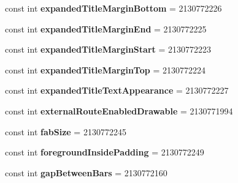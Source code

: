 \begin{DoxyCompactItemize}
const int {\bfseries expanded\+Title\+Margin\+Bottom} = 2130772226
\item 
\mbox{\label{class_pinned_app_1_1_droid_1_1_resource_1_1_attribute_a1eaa227489b33d853421362cdaa9c456}} 
const int {\bfseries expanded\+Title\+Margin\+End} = 2130772225
\item 
\mbox{\label{class_pinned_app_1_1_droid_1_1_resource_1_1_attribute_a56f2017d06f2047e019e582e5f820205}} 
const int {\bfseries expanded\+Title\+Margin\+Start} = 2130772223
\item 
\mbox{\label{class_pinned_app_1_1_droid_1_1_resource_1_1_attribute_aab2fb18567590b37b1f568d2fc99a039}} 
const int {\bfseries expanded\+Title\+Margin\+Top} = 2130772224
\item 
\mbox{\label{class_pinned_app_1_1_droid_1_1_resource_1_1_attribute_ae05054956b217031566367be0abed923}} 
const int {\bfseries expanded\+Title\+Text\+Appearance} = 2130772227
\item 
\mbox{\label{class_pinned_app_1_1_droid_1_1_resource_1_1_attribute_a90b6e17c852676ddb29de6bc76f2a2c1}} 
const int {\bfseries external\+Route\+Enabled\+Drawable} = 2130771994
\item 
\mbox{\label{class_pinned_app_1_1_droid_1_1_resource_1_1_attribute_ab590cb3d177383e8e0141f3ba41ee7d2}} 
const int {\bfseries fab\+Size} = 2130772245
\item 
\mbox{\label{class_pinned_app_1_1_droid_1_1_resource_1_1_attribute_a7613d360ecd4472557095f82eb6ed617}} 
const int {\bfseries foreground\+Inside\+Padding} = 2130772249
\item 
\mbox{\label{class_pinned_app_1_1_droid_1_1_resource_1_1_attribute_a853e1b00843b3a83c1d79e8344aa980e}} 
const int {\bfseries gap\+Between\+Bars} = 2130772160
\item 

\end{DoxyCompactItemize}
